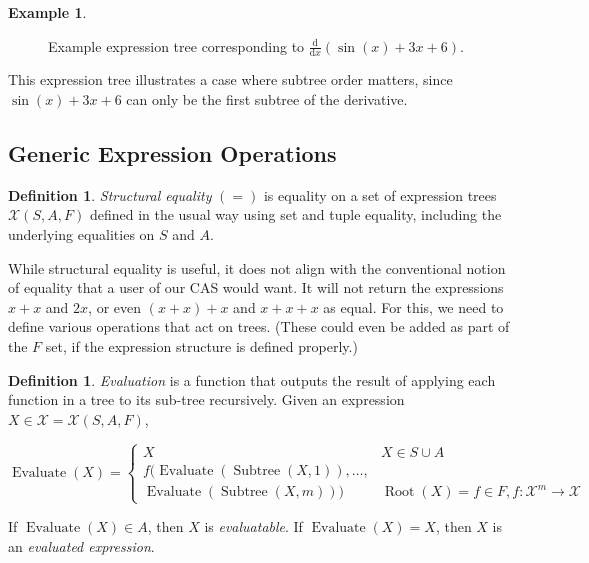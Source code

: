 \documentclass{article}
\theoremstyle{definition}
\newtheorem{defin}[thm]{Definition}
\newtheorem{exa}[thm]{Example}
\DeclareMathOperator{\Root}{Root}
\DeclareMathOperator{\subtree}{Subtree}
\DeclareMathOperator{\eval}{Evaluate}
\begin{document}
\begin{exa}
\begin{figure}[H]
\caption{Example expression tree corresponding to $\frac{\mathrm{d}}{\mathrm{d}x}(\sin(x) + 3x + 6)$. \label{fig:2}}
\end{figure}

This expression tree illustrates a case where subtree order matters, since $\sin(x)+3x+6$ can only be the first subtree of the derivative.
    
    
\end{exa}

\subsection{Generic Expression Operations}

\begin{defin}
    \emph{Structural equality} $(=)$ is equality on a set of expression trees $\mathcal{X}(S, A, F)$ defined in the usual way using set and tuple equality, including the underlying equalities on $S$ and $A$.
\end{defin}

While structural equality is useful, it does not align with the conventional notion of equality that a user of our CAS would want. It will not return the expressions $x + x$ and $2x$, or even $(x + x) + x$ and $x + x + x$ as equal. For this, we need to define various operations that act on trees. (These could even be added as part of the $F$ set, if the expression structure is defined properly.)

\begin{defin}
    \emph{Evaluation} is a function that outputs the result of applying each function in a tree to its sub-tree recursively. Given an expression $X \in \mathcal{X} = \mathcal{X}(S, A, F)$,
    
    \begin{equation*}
        \eval(X) = \begin{cases}
                X & X \in S \cup A \\
                f(\eval(\subtree(X,1)), \ldots, \\ \eval(\subtree(X,m))) & \Root(X) = f \in F, f:\mathcal{X}^m\to\mathcal{X}
                \end{cases}
    \end{equation*}
    
    If $\eval(X) \in A$, then $X$ is \emph{evaluatable}. If $\eval(X) = X$, then $X$ is an \emph{evaluated expression}. 
\end{defin}
\end{document}

